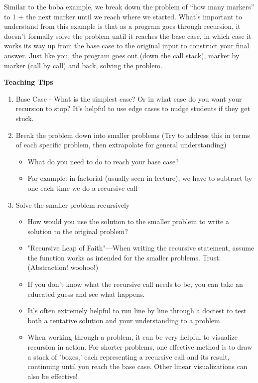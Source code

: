 \begin{blocksection}
Similar to the boba example, we break down the problem of ``how many markers'' to 1 + the next marker until we reach where we started. What's important to understand from this example is that as a program goes through recursion, it doesn't formally solve the problem until it reaches the base case, in which case it works its way up from the base case to the original input to construct your final answer. Just like you, the program goes out (down the call stack), marker by marker (call by call) and back, solving the problem.
\end{blocksection}

\begin{meta}
\textbf{Teaching Tips}
\begin{enumerate}
	    \item Base Case - What is the simplest case? Or in what case do you want your recursion to stop? It's helpful to use edge cases to nudge students if they get stuck.
	    \item Break the problem down into smaller problems (Try to address this in terms of each specific problem, then extrapolate for general understanding)
	    \begin{itemize}
			\item What do you need to do to reach your base case?
			\item For example: in factorial (usually seen in lecture), we have to subtract by one each time we do a recursive call
		\end{itemize}
		\item Solve the smaller problem recursively
		\begin{itemize}
			\item How would you use the solution to the smaller problem to write a solution to the original problem?
			\item "Recursive Leap of Faith"---When writing the recursive statement, assume the function works as intended for the smaller problems. Trust. (Abstraction! woohoo!)
			\item If you don't know what the recursive call needs to be, you can take an educated guess and see what happens. 
			\item It's often extremely helpful to run line by line through a doctest to test both a tentative solution and your understanding to a problem.
			\item When working through a problem, it can be very helpful to visualize recursion in action. For shorter problems, one effective method is to draw a stack of 'boxes,' each representing a recursive call and its result, continuing until you reach the base case. Other linear visualizations can also be effective!

\end{itemize}
\end{enumerate}
\end{meta}
